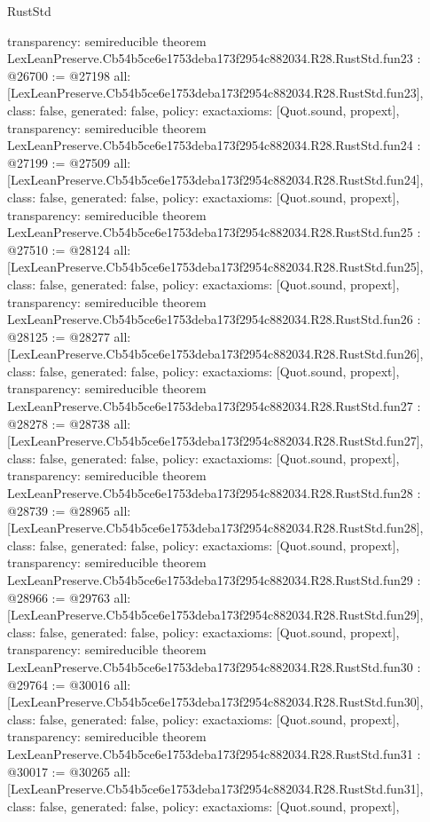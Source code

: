 \begin{lexlean}{RustStd}
\begin{coremodule}
{  transparency: semireducible
}
theorem LexLeanPreserve.Cb54b5ce6e1753deba173f2954c882034.R28.RustStd.fun23 : @26700 := @27198 {
  all: [LexLeanPreserve.Cb54b5ce6e1753deba173f2954c882034.R28.RustStd.fun23],
  class: false,
  generated: false,
  policy: exact{axioms: [Quot.sound, propext]},
  transparency: semireducible
}
theorem LexLeanPreserve.Cb54b5ce6e1753deba173f2954c882034.R28.RustStd.fun24 : @27199 := @27509 {
  all: [LexLeanPreserve.Cb54b5ce6e1753deba173f2954c882034.R28.RustStd.fun24],
  class: false,
  generated: false,
  policy: exact{axioms: [Quot.sound, propext]},
  transparency: semireducible
}
theorem LexLeanPreserve.Cb54b5ce6e1753deba173f2954c882034.R28.RustStd.fun25 : @27510 := @28124 {
  all: [LexLeanPreserve.Cb54b5ce6e1753deba173f2954c882034.R28.RustStd.fun25],
  class: false,
  generated: false,
  policy: exact{axioms: [Quot.sound, propext]},
  transparency: semireducible
}
theorem LexLeanPreserve.Cb54b5ce6e1753deba173f2954c882034.R28.RustStd.fun26 : @28125 := @28277 {
  all: [LexLeanPreserve.Cb54b5ce6e1753deba173f2954c882034.R28.RustStd.fun26],
  class: false,
  generated: false,
  policy: exact{axioms: [Quot.sound, propext]},
  transparency: semireducible
}
theorem LexLeanPreserve.Cb54b5ce6e1753deba173f2954c882034.R28.RustStd.fun27 : @28278 := @28738 {
  all: [LexLeanPreserve.Cb54b5ce6e1753deba173f2954c882034.R28.RustStd.fun27],
  class: false,
  generated: false,
  policy: exact{axioms: [Quot.sound, propext]},
  transparency: semireducible
}
theorem LexLeanPreserve.Cb54b5ce6e1753deba173f2954c882034.R28.RustStd.fun28 : @28739 := @28965 {
  all: [LexLeanPreserve.Cb54b5ce6e1753deba173f2954c882034.R28.RustStd.fun28],
  class: false,
  generated: false,
  policy: exact{axioms: [Quot.sound, propext]},
  transparency: semireducible
}
theorem LexLeanPreserve.Cb54b5ce6e1753deba173f2954c882034.R28.RustStd.fun29 : @28966 := @29763 {
  all: [LexLeanPreserve.Cb54b5ce6e1753deba173f2954c882034.R28.RustStd.fun29],
  class: false,
  generated: false,
  policy: exact{axioms: [Quot.sound, propext]},
  transparency: semireducible
}
theorem LexLeanPreserve.Cb54b5ce6e1753deba173f2954c882034.R28.RustStd.fun30 : @29764 := @30016 {
  all: [LexLeanPreserve.Cb54b5ce6e1753deba173f2954c882034.R28.RustStd.fun30],
  class: false,
  generated: false,
  policy: exact{axioms: [Quot.sound, propext]},
  transparency: semireducible
}
theorem LexLeanPreserve.Cb54b5ce6e1753deba173f2954c882034.R28.RustStd.fun31 : @30017 := @30265 {
  all: [LexLeanPreserve.Cb54b5ce6e1753deba173f2954c882034.R28.RustStd.fun31],
  class: false,
  generated: false,
  policy: exact{axioms: [Quot.sound, propext]},
}
\end{coremodule}
\end{lexlean}
